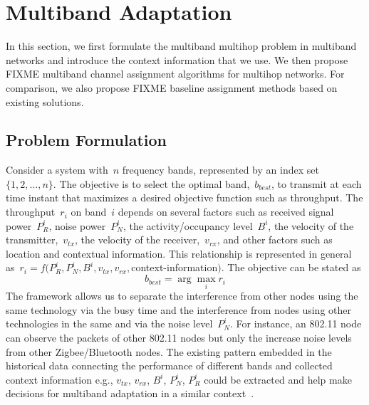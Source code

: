 \section{Multiband Adaptation}
\label{sec:model}

In this section, we first formulate the multiband 
multihop problem 
in multiband networks and introduce the context information 
that we use. We then propose {FIXME} multiband channel assignment algorithms for multihop networks. For comparison, we also propose {FIXME} baseline assignment methods based on existing solutions.

\subsection{Problem Formulation}
Consider a system with~$n$ frequency bands, represented by an index set~$\{1,2, \ldots, n\}$. 
The objective is to select the optimal band,~$b_{best}$, to transmit at each time instant that maximizes a desired objective function such as throughput. The throughput~$r_i$ on band~$i$ depends on several factors such as received signal power~$P_R^i$, noise power~$P_N^i$, the activity/occupancy level~$B^i$, the velocity of the transmitter,~$v_{tx}$, the velocity of the receiver,~$v_{rx}$, and other factors such as location and contextual information. This relationship is represented in general as~$r_i = f(P_R^i,P_N^i,B^i,v_{tx},v_{rx},$context-information$)$. The objective can be stated as
\begin{equation}
b_{best}= \arg \max_i r_i 
\end{equation}
The framework allows us to separate the interference from other nodes using the same technology via the busy time and the interference from nodes using other technologies in the same and via the noise level~$P_N^i$. For instance, an 802.11 node can observe the packets of other 802.11 nodes but only the increase noise levels from other Zigbee/Bluetooth nodes.
The existing pattern embedded in the historical data connecting 
the performance of different bands and collected context information 
e.g., $v_{tx}$, $v_{rx}$, $B^i$, $P_N^i$, $P_R^i$ 
could be extracted and help make decisions
for multiband adaptation in a similar context~\cite{meikle2012global}.


